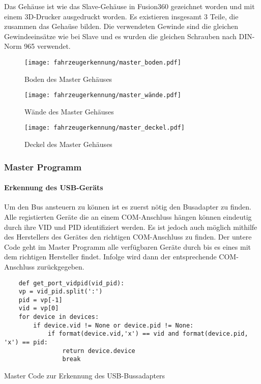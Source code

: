 Das Gehäuse ist wie das Slave-Gehäuse in Fusion360 gezeichnet worden und mit einem 3D-Drucker ausgedruckt worden. Es existieren insgesamt 3 Teile, die zusammen das Gehaüse bilden.
Die verwendeten Gewinde sind die gleichen Gewindeeinsätze wie bei Slave und es wurden die gleichen Schrauben nach DIN-Norm 965 verwendet.

\begin{figure}[!htb]
        \texttt{[image: fahrzeugerkennung/master\_boden.pdf]}
        \caption{Boden des Master Gehäuses}
    \endminipage\hfill
        \texttt{[image: fahrzeugerkennung/master\_wände.pdf]}
        \caption{Wände des Master Gehäuses}
    \endminipage\hfill
        \texttt{[image: fahrzeugerkennung/master\_deckel.pdf]}
        \caption{Deckel des Master Gehäuses}
    \endminipage
\end{figure}
\subsubsection{Master Programm}

\paragraph{Erkennung des USB-Geräts}\mbox{} 

Um den Bus ansteuern zu können ist es zuerst nötig den Busadapter zu finden. Alle registierten Geräte die an einem COM-Anschluss hängen können eindeutig durch ihre VID und PID identifiziert werden. 
Es ist jedoch auch möglich mithilfe des Herstellers des Gerätes den richtigen COM-Anschluss zu finden. Der untere Code geht im Master Programm alle verfügbaren Geräte durch bis es eines mit dem richtigen Hersteller findet.
Infolge wird dann der entsprechende COM-Anschluss zurückgegeben.

\begin{listing}[H]
    \begin{verbatim}
    def get_port_vidpid(vid_pid):
    vp = vid_pid.split(':')
    pid = vp[-1]
    vid = vp[0]
    for device in devices:
        if device.vid != None or device.pid != None:
            if format(device.vid,'x') == vid and format(device.pid, 'x') == pid:
                return device.device
                break
    \end{verbatim}
    \caption{Master Code zur Erkennung des USB-Bussadapters}
\end{listing}


